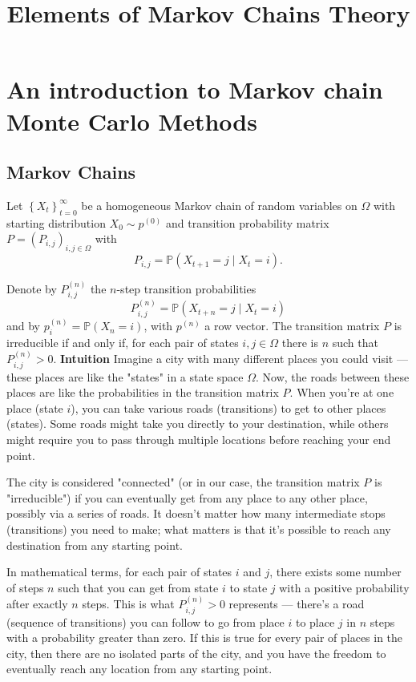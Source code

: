 \documentclass[10pt]{article}
\title{Elements of Markov Chains Theory}
\begin{document}
\maketitle
\section{An introduction to Markov chain Monte Carlo Methods}
\subsection{Markov Chains}
Let $\left\{X_t\right\}_{t=0}^{\infty}$ be a homogeneous Markov chain of random variables on $\Omega$ with starting distribution $X_0 \sim p^{(0)}$ and transition probability matrix $P=\left(P_{i, j}\right)_{i, j \in \Omega}$ with
$$
P_{i, j}=\mathbb{P}\left(X_{t+1}=j \mid X_t=i\right) .
$$

Denote by $P_{i, j}^{(n)}$ the $n$-step transition probabilities
$$
P_{i, j}^{(n)}=\mathbb{P}\left(X_{t+n}=j \mid X_t=i\right)
$$
and by $p_i^{(n)}=\mathbb{P}\left(X_n=i\right)$, with $p^{(n)}$ a row vector.
The transition matrix $P$ is irreducible if and only if, for each pair of states $i, j \in \Omega$ there is $n$ such that $P_{i, j}^{(n)}>0$. 
\newline
\textbf{Intuition} \newline
Imagine a city with many different places you could visit — these places are like the "states" in a state space \( \Omega \). Now, the roads between these places are like the probabilities in the transition matrix \( P \). When you're at one place (state \( i \)), you can take various roads (transitions) to get to other places (states). Some roads might take you directly to your destination, while others might require you to pass through multiple locations before reaching your end point.

The city is considered "connected" (or in our case, the transition matrix \( P \) is "irreducible") if you can eventually get from any place to any other place, possibly via a series of roads. It doesn't matter how many intermediate stops (transitions) you need to make; what matters is that it's possible to reach any destination from any starting point. 

In mathematical terms, for each pair of states \( i \) and \( j \), there exists some number of steps \( n \) such that you can get from state \( i \) to state \( j \) with a positive probability after exactly \( n \) steps. This is what \( P_{i, j}^{(n)}>0 \) represents — there's a road (sequence of transitions) you can follow to go from place \( i \) to place \( j \) in \( n \) steps with a probability greater than zero. If this is true for every pair of places in the city, then there are no isolated parts of the city, and you have the freedom to eventually reach any location from any starting point.
\end{document}
